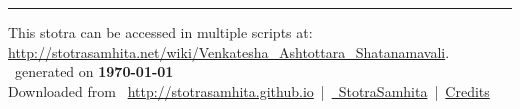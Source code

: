 \documentclass[oneside,12pt]{book}
\begin{document}
\setmainfont[Script=Devanagari,Mapping=tex-text]{Sanskrit 2003}
\fontsize {16}{19.25}\selectfont
\begin{center}

\end{center}
\vfill
\centering
\rule{0.8\textwidth}{0.6pt}

\footnotesize
{}\sffamily
This stotra can be accessed in multiple scripts at:\\
\url{http://stotrasamhita.net/wiki/Venkatesha_Ashtottara_Shatanamavali}.\\[1ex]
\faFilePdfO~generated on \textbf{\today}\\[1ex]
Downloaded from \faGlobe{}~\url{http://stotrasamhita.github.io}~|~\href{https://github.com/StotraSamhita}{\faGithubSquare{}~StotraSamhita}~|~\href{https://stotrasamhita.github.io/about/}{Credits}
\end{document}
